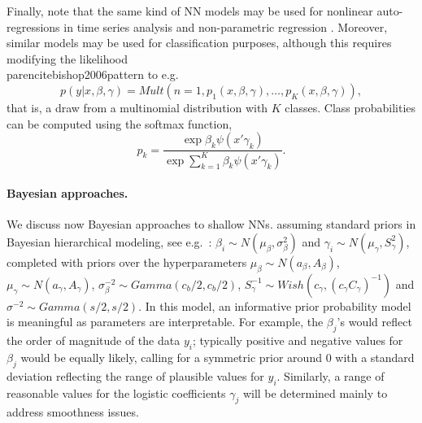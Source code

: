 Finally, note that the same kind of NN models 
may be used for nonlinear auto-regressions in
time series analysis \parencite{menchero} and 
non-parametric 
regression \parencite{insuamuller}. Moreover,
similar models may be used for classification purposes,
although this 
 requires modifying the likelihood
\\parencite{bishop2006pattern} to e.g.\
\begin{equation}
    p(y | x, \beta, \gamma) = Mult(n=1, 
    p_1 (x, \beta, \gamma) , \ldots, p_K (x, \beta, \gamma) ),
\end{equation}
that is, a draw from a multinomial distribution with $K$ classes. 
Class probabilities
 can be computed using the softmax function,
$$
p_k = \frac{\exp{\beta_k \psi(x'\gamma_k)}}{\exp{\sum_{k=1}^K \beta_k \psi(x'\gamma_k)}}.
$$


\paragraph{Bayesian approaches.}\label{bayeshallow}
We discuss now Bayesian approaches to shallow NNs.
assuming standard priors 
in Bayesian hierarchical modeling, see e.g.\ \textcite{LavineWest}: 
$  \beta_i      \sim  N(\mu_\beta,\sigma_\beta^2)$
and 
  $\gamma_i     \sim  N(\mu_\gamma,S_\gamma^2)$,
  completed with priors over the hyperparameters
$\mu_\beta \sim N(a_\beta,A_\beta)$,
$\mu_\gamma \sim N(a_\gamma,A_\gamma)$,
$\sigma^{-2}_\beta \sim Gamma(c_b/2,c_b/2)$,
$S_\gamma^{-1} \sim Wish(c_\gamma,(c_\gamma C_\gamma)^{-1})$ and
$\sigma^{-2} \sim Gamma(s/2, s/2)$.
In this model, 
an informative prior probability model
is meaningful as parameters are interpretable. For example, the $\beta_ j$’s would reflect the
order of magnitude of the data $y_i$; typically positive and negative values for
$\beta _j$ would be equally likely, calling for a symmetric prior around 
0 with
a standard deviation reflecting the range of plausible values for $y_i$. Similarly,
a range of reasonable values for the logistic coefficients $\gamma_ j$ will be determined
mainly to address smoothness
issues.

